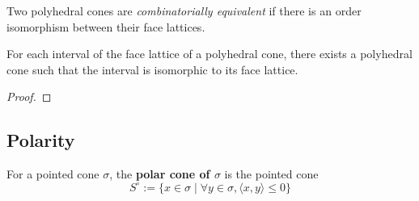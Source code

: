 \begin{definition}
  \label{combinatorial-equivalence}
  Two polyhedral cones are \emph{combinatorially equivalent} if there
  is an order isomorphism between their face lattices.
\end{definition}

\begin{lemma}
  \label{face-lattice-intervals}
  For each interval of the face lattice of a polyhedral cone, there exists
  a polyhedral cone such that the interval is isomorphic to its face lattice.
\end{lemma}
\begin{proof}
\end{proof}

\subsection{Polarity}

\begin{definition}
  \label{polar-cone}
  For a pointed cone \( \sigma \), the {\bf polar cone of \( \sigma \)} is
  the pointed cone
  \[
      S^\circ := \{x \in \sigma \mid \forall y \in \sigma, \langle x, y \rangle
      \leq 0 \}
  \]
\end{definition}



